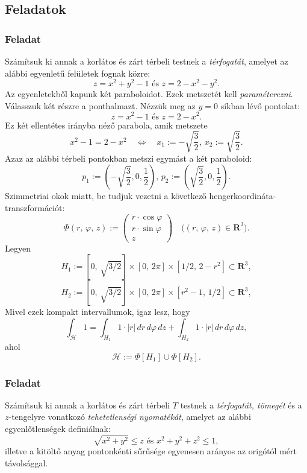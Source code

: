 \documentclass{article}
\newcommand{\R}{\mathbf{R}}
\begin{document}
	\subsection{Feladatok}
	\subsubsection{Feladat}
	Számítsuk ki annak a korlátos és zárt térbeli testnek a \textit{térfogatát}, amelyet az alábbi egyenletű felületek fognak közre:
	\[
		z = x^2 + y^2 -1 \text{ és } z = 2 - x^2 - y^2.
	\]
	Az egyenletekből kapunk két paraboloidot. Ezek metszetét kell \textit{paraméterezni}. Válasszuk két részre a ponthalmazt. Nézzük meg az $y = 0$ síkban lévő pontokat:
	\[
		z = x^2 - 1 \text{ és } z = 2 - x^2.
	\]
	Ez két ellentétes irányba néző parabola, amik metszete
	\[
		x^2 - 1 = 2 - x^2 \quad \Longleftrightarrow \quad x_1 := - \sqrt{\frac{3}{2}}, \, x_2 := \sqrt{\frac{3}{2}}.
	\]
	Azaz az alábbi térbeli pontokban metszi egymást a két paraboloid:
	\[
		p_1 := \left( - \sqrt{\frac{3}{2}}, 0, \frac{1}{2} \right), \, p_2 := \left( \sqrt{\frac{3}{2}}, 0, \frac{1}{2} \right).
	\]
	Szimmetriai okok miatt, be tudjuk vezetni a következő hengerkoordináta-transzformációt:
	\[
		\Phi(r, \, \varphi, \, z) := \begin{pmatrix}
			r \cdot \cos \varphi \\
			r \cdot \sin \varphi \\
			z
		\end{pmatrix} \quad \big( (r, \, \varphi, \, z) \in \R^3 \big).
	\]
	Legyen
	\[
		H_1 := [0, \, \sqrt{3 / 2}] \times [0, \, 2 \pi] \times [1/2, \, 2-r^2] \subset \R^3,
	\]
	\[
		H_2 := [0, \, \sqrt{3 / 2}] \times [0, \, 2 \pi] \times [r^2-1, \, 1/2] \subset \R^3,
	\]
	Mivel ezek kompakt intervallumok, igaz lesz, hogy
	\[
		\int_{\mathcal{H}} 1 = \int_{H_1} 1 \cdot |r| \, dr \, d\varphi \, dz + \int_{H_2} 1 \cdot |r| \, dr \, d\varphi \, dz, 
	\]
	ahol
	\[
		\mathcal{H} := \Phi[H_1] \cup \Phi[H_2].
	\]
	
	\subsubsection{Feladat}
	Számítsuk ki annak a korlátos és zárt térbeli $T$ testnek a \textit{térfogatát, tömegét} és a $z$-tengelyre vonatkozó \textit{tehetetlenségi nyomatékát}, amelyet az alábbi egyenlőtlenségek definiálnak:
	\[
		\sqrt{x^2 + y^2} \leq z \text{ és } x^2 + y^2 + z^2 \leq 1,
	\]
	illetve a kitöltő anyag pontonkénti sűrűsége egyenesen arányos az origótól mért távolsággal.
\end{document}
